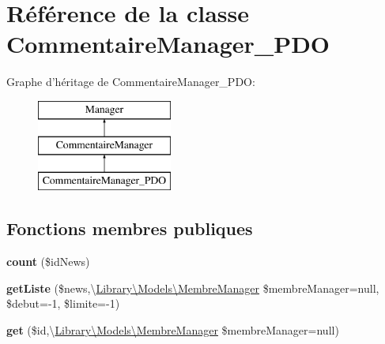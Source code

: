\hypertarget{class_library_1_1_models_1_1_commentaire_manager___p_d_o}{\section{Référence de la classe Commentaire\+Manager\+\_\+\+P\+D\+O}
\label{class_library_1_1_models_1_1_commentaire_manager___p_d_o}
}
Graphe d'héritage de Commentaire\+Manager\+\_\+\+P\+D\+O\+:\begin{figure}[H]
\begin{center}
\leavevmode
\includegraphics[height=3.000000cm]{class_library_1_1_models_1_1_commentaire_manager___p_d_o}
\end{center}
\end{figure}
\subsection*{Fonctions membres publiques}
\begin{DoxyCompactItemize}
\item 
\hypertarget{class_library_1_1_models_1_1_commentaire_manager___p_d_o_aca7b2ef6da2d75355af20da41366eb1b}{{\bfseries count} (\$id\+News)}\label{class_library_1_1_models_1_1_commentaire_manager___p_d_o_aca7b2ef6da2d75355af20da41366eb1b}

\item 
\hypertarget{class_library_1_1_models_1_1_commentaire_manager___p_d_o_ade6f6876b4aad9913c6ce2f7520df9a1}{{\bfseries get\+Liste} (\$news,\textbackslash{}\hyperlink{class_library_1_1_models_1_1_membre_manager}{Library\textbackslash{}\+Models\textbackslash{}\+Membre\+Manager} \$membre\+Manager=null, \$debut=-\/1, \$limite=-\/1)}\label{class_library_1_1_models_1_1_commentaire_manager___p_d_o_ade6f6876b4aad9913c6ce2f7520df9a1}

\item 
\hypertarget{class_library_1_1_models_1_1_commentaire_manager___p_d_o_a4b967c98c88ef89b5ff3dc587332cc8e}{{\bfseries get} (\$id,\textbackslash{}\hyperlink{class_library_1_1_models_1_1_membre_manager}{Library\textbackslash{}\+Models\textbackslash{}\+Membre\+Manager} \$membre\+Manager=null)}\label{class_library_1_1_models_1_1_commentaire_manager___p_d_o_a4b967c98c88ef89b5ff3dc587332cc8e}

\end{DoxyCompactItemize}
